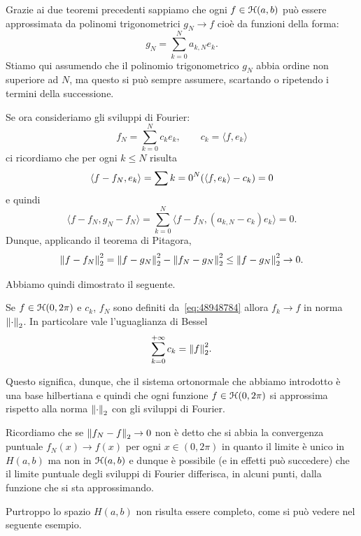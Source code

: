 Grazie ai due teoremi precedenti sappiamo che ogni $f\in \mathcal H(a,b)$ può essere
approssimata da polinomi trigonometrici $g_N\to f$
cioè da funzioni della forma:
\[
  g_N = \sum_{k=0}^{N} a_{k,N} e_k.
\]
Stiamo qui assumendo che il polinomio trigonometrico $g_N$ abbia ordine non superiore
ad $N$, ma questo si può sempre assumere, scartando
o ripetendo i termini della successione.

Se ora consideriamo gli sviluppi di Fourier:
\begin{equation}\label{eq:48948784}
  f_N = \sum_{k=0}^N c_k e_k, \qquad c_k = \langle f,e_k\rangle
\end{equation}
ci ricordiamo che per ogni $k\le N$ risulta
\[
   \langle f-f_N, e_k \rangle
   = \sum{k=0}^N {\left( \langle f,e_k\rangle - c_k \right)} = 0
\]
e quindi
\[
  \langle f-f_N , g_N -f_N\rangle
  = \sum_{k=0}^N \langle f-f_N, (a_{k,N}-c_k) e_k \rangle
  = 0.
\]
Dunque, applicando il teorema di Pitagora,
\[
  {\left\Vert f-f_N\right\Vert}_2^2 = {\left\Vert f-g_N\right\Vert}_2^2 - {\left\Vert f_N-g_N\right\Vert}_2^2
  \le {\left\Vert f-g_N\right\Vert}_2^2 \to 0.
\]

Abbiamo quindi dimostrato il seguente.
\begin{theorem}
Se $f\in \mathcal H(0,2\pi)$ e $c_k$, $f_N$
sono definiti da~\eqref{eq:48948784}
allora $f_k\to f$ in norma ${\left\Vert \cdot\right\Vert}_2$.
In particolare vale l'uguaglianza di Bessel
\begin{equation}\label{eq:uguaglianza_Bessel}
  \sum_{k=0}^{+\infty} c_k = {\left\Vert f\right\Vert}_2^2.
\end{equation}
\end{theorem}


Questo significa, dunque, che il sistema ortonormale che abbiamo introdotto
è una base hilbertiana e quindi che ogni funzione $f\in \mathcal H(0,2\pi)$
si approssima
rispetto alla norma ${\left\Vert \cdot \right\Vert}_2$ con gli sviluppi di Fourier.

Ricordiamo che se ${\left\Vert f_N-f\right\Vert}_2 \to 0$ non è detto che si abbia la convergenza
puntuale $f_N(x)\to f(x)$ per ogni $x\in (0,2\pi)$ in quanto il limite è unico
in $H(a,b)$ ma non in $\mathcal H(a,b)$ e dunque è possibile (e in effetti può succedere)
che il limite puntuale degli sviluppi di Fourier differisca, in alcuni punti,
dalla funzione che si sta approssimando.

Purtroppo lo spazio $H(a,b)$ non risulta essere
completo, come si può vedere nel seguente esempio.

